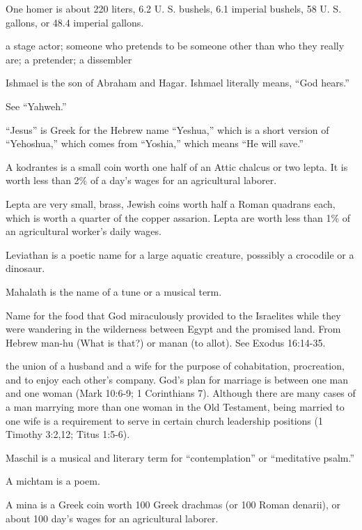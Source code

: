 \begin{multicols}{2}
One homer is about 220 liters, 6.2 U. S. bushels, 6.1 imperial
bushels, 58 U. S. gallons, or 48.4 imperial gallons.

a stage actor; someone who pretends to be someone other than who they
really are; a pretender; a dissembler

Ishmael is the son of Abraham and Hagar. Ishmael literally means,
{``}God hears.{''}

See {``}Yahweh.{''}

{``}Jesus{''} is Greek for the Hebrew name {``}Yeshua,{''} which is a
short version of {``}Yehoshua,{''} which comes from {``}Yoshia,{''}
which means {``}He will save.{''}

A kodrantes is a small coin worth one half of an Attic chalcus or two
lepta. It is worth less than 2\% of a day's wages for an agricultural
laborer.

Lepta are very small, brass, Jewish coins worth half a Roman quadrans
each, which is worth a quarter of the copper assarion. Lepta are
worth less than 1\% of an agricultural worker's daily wages.

Leviathan is a poetic name for a large aquatic creature, posssibly a
crocodile or a dinosaur.

Mahalath is the name of a tune or a musical term.

Name for the food that God miraculously provided to the Israelites
while they were wandering in the wilderness between Egypt and the
promised land. From Hebrew man-hu (What is that?) or manan (to
allot). See Exodus 16:14-35.

the union of a husband and a wife for the purpose of cohabitation,
procreation, and to enjoy each other's company. God's plan for
marriage is between one man and one woman (Mark 10:6-9; 1 Corinthians
7). Although there are many cases of a man marrying more than one
woman in the Old Testament, being married to one wife is a
requirement to serve in certain church leadership positions (1
Timothy 3:2,12; Titus 1:5-6).

Maschil is a musical and literary term for {``}contemplation{''} or
{``}meditative psalm.{''}

A michtam is a poem.

A mina is a Greek coin worth 100 Greek drachmas (or 100 Roman
denarii), or about 100 day's wages for an agricultural laborer.


\end{multicols}
